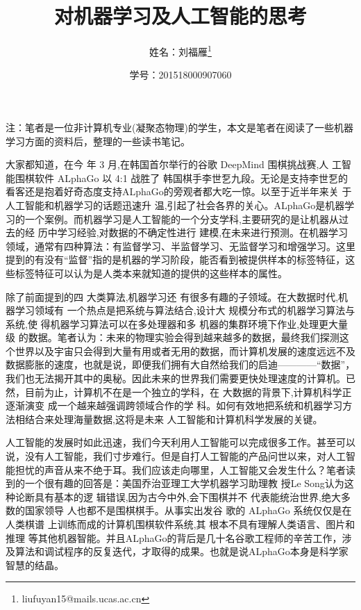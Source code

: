 \documentclass{article}
\author{姓名：刘福雁\thanks{liufuyan15@mails.ucas.ac.cn}}
\date{学号：201518000907060}
\title{对机器学习及人工智能的思考}
\newcommand{\song}{\CJKfamily{song}}    %
\newcommand{\kai}{\CJKfamily{kai}}          %
\newcommand{\banxiaosi}{\fontsize{13pt}{19.5pt}\selectfont}    %
\newcommand{\xiaosi}{\fontsize{12pt}{18pt}\selectfont}            %
\begin{document}
\maketitle
\kai\xiaosi\noindent 注：笔者是一位非计算机专业(凝聚态物理)的学生，本文是笔者在阅读了一些机器学习方面的资料后，整理的一些读书笔记。

\song\banxiaosi  大家都知道，在今 年 3 月,在韩国首尔举行的谷歌 DeepMind 围棋挑战赛,人 工智能围棋软件 ALphaGo 以 4:1 战胜了 韩国棋手李世乭九段。无论是支持李世乭的看客还是抱着好奇态度支持ALphaGo的旁观者都大吃一惊。以至于近半年来关 于人工智能和机器学习的话题迅速升 温,引起了社会各界的关心。ALphaGo是机器学习的一个案例。而机器学习是人工智能的一个分支学科,主要研究的是让机器从过去的经 历中学习经验,对数据的不确定性进行 建模,在未来进行预测。在机器学习领域，通常有四种算法：有监督学习、半监督学习、无监督学习和增强学习。这里提到的有没有“监督”指的是机器的学习阶段，能否看到被提供样本的标签特征，这些标签特征可以认为是人类本来就知道的提供的这些样本的属性。

除了前面提到的四 大类算法,机器学习还 有很多有趣的子领域。在大数据时代,机器学习领域有 一个热点是把系统与算法结合,设计大 规模分布式的机器学习算法与系统,使 得机器学习算法可以在多处理器和多 机器的集群环境下作业,处理更大量级 的数据。笔者认为：未来的物理实验会得到越来越多的数据，最终我们探测这个世界以及宇宙只会得到大量有用或者无用的数据，而计算机发展的速度远远不及数据膨胀的速度，也就是说，即便我们拥有大自然给我们的启迪————“数据”，我们也无法揭开其中的奥秘。因此未来的世界我们需要更快处理速度的计算机。已然，目前为止，计算机不在是一个独立的学科，在 大数据的背景下,计算机科学正逐渐演变 成一个越来越强调跨领域合作的学 科。如何有效地把系统和机器学习方 法相结合来处理海量数据,这将是未来 人工智能和计算机科学发展的关键。

人工智能的发展时如此迅速，我们今天利用人工智能可以完成很多工作。甚至可以说，没有人工智能，我们寸步难行。但是自打人工智能的产品问世以来，对人工智能担忧的声音从来不绝于耳。我们应该走向哪里，人工智能又会发生什么？笔者读到的一个很有趣的回答是：美国乔治亚理工大学机器学习助理教 授Le Song认为这种论断具有基本的逻 辑错误,因为古今中外,会下围棋并不 代表能统治世界,绝大多数的国家领导 人也都不是围棋棋手。从事实出发谷 歌的 ALphaGo 系统仅仅是在人类棋谱 上训练而成的计算机围棋软件系统,其 根本不具有理解人类语言、图片和推理 等其他机器智能。并且ALphaGo的背后是几十名谷歌工程师的辛苦工作，涉及算法和调试程序的反复迭代，才取得的成果。也就是说ALphaGo本身是科学家智慧的结晶。
\end{document}
